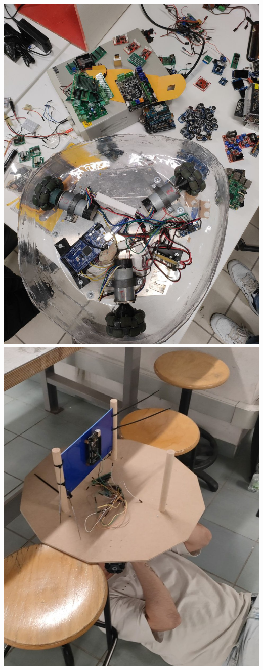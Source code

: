 \documentclass{article}
\begin{document}
\begin{minipage}[t]{0.5\textwidth}
\end{minipage}
\hfill
\begin{minipage}[t]{0.5\textwidth}
\vspace{0pt}
  \includegraphics[width=0.9\linewidth]{photos/6.jpg}
  \vspace{0pt}
  \includegraphics[width=0.9\linewidth]{photos/dani_fixing_robot.jpeg}

\end{minipage}
\end{document}
